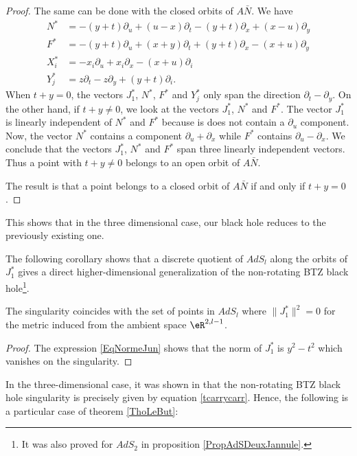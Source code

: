 \begin{proof}
The same can be done with the closed orbits of $A\bar{N}$. We have
\begin{subequations}
\begin{align}
	N^*	&=	-(y+t)\partial_u+(u-x)\partial_t-(y+t)\partial_x+(x-u)\partial_y\\
	F^*	&=	-(y+t)\partial_u+(x+y)\partial_t+(y+t)\partial_x-(x+u)\partial_y\\
	X^*_i	&=	-x_i\partial_u+x_i\partial_x-(x+u)\partial_i\\
	Y_j^*	&=	z\partial_t-z\partial_y+(y+t)\partial_i.
\end{align}
\end{subequations}
When $t+y=0$, the vectors $J_1^*$, $N^*$, $F^*$ and $Y_j^*$ only span the direction $\partial_t-\partial_y$. On the other hand, if $t+y\neq 0$, we look at the vectors $J_1^*$, $N^*$ and $F^*$. The vector $J_1^*$ is linearly independent of $N^*$ and $F^*$ because is does not contain a $\partial_u$ component. Now, the vector $N^*$ contains a component $\partial_u+\partial_x$ while $F^*$ contains $\partial_u-\partial_x$. We conclude that the vectors $J_1^*$, $N^*$ and $F^*$ span three linearly independent vectors. Thus a point with $t+y\neq 0$ belongs to an open orbit of $A\bar N$.

The result is that a point belongs to a closed orbit of $A\bar{N}$ if and only if $t+y=0$.
\end{proof}
This shows that in the three dimensional case, our black hole reduces to the previously existing one. 

The following corollary shows that a discrete quotient of $AdS_l$ along the orbits of $J_1^*$ gives a direct higher-dimensional generalization of the non-rotating BTZ black hole\footnote{It was also proved for \( AdS_2\) in proposition \ref{PropAdSDeuxJannule}.}.
\begin{corollary} \label{CorJannsingul}
The singularity coincides with the set of points in $AdS_l$ where $\| J_1^* \|^2 = 0$ for the metric induced from the ambient space $\eR^{2,l-1}$.
\end{corollary}

\begin{proof}
    The expression \eqref{EqNormeJun} shows that the norm of $J_1^* $ is $y^2-t^2$ which vanishes on the singularity.
\end{proof}

In the three-dimensional case, it was shown in \cite{BTZ_deux,BTZB_un} that the non-rotating BTZ black hole singularity is precisely given by equation \eqref{tcarrycarr}. Hence, the following is a particular case of theorem \ref{ThoLeBut}:

